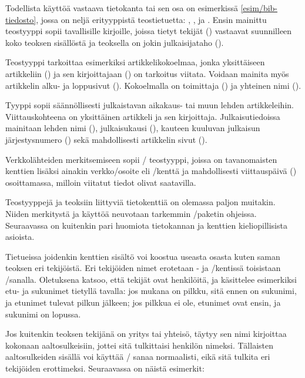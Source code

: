 Todellista käyttöä vastaava tietokanta tai sen osa on esimerkissä
\ref{esim/bib-tiedosto}, jossa on neljä erityyppistä teostietuetta:
, ,  ja .
Ensin mainittu teostyyppi  sopii tavallisille kirjoille,
joissa tietyt tekijät () vastaavat suunnilleen koko
teoksen sisällöstä ja teoksella on jokin julkaisijataho
().

Teostyyppi  tarkoittaa esimerkiksi
artikkelikokoelmaa, jonka yksittäiseen artikkeliin () ja
sen kirjoittajaan () on tarkoitus viitata. Voidaan mainita
myös artikkelin alku- ja loppusivut (). Kokoelmalla on
toimittaja () ja yhteinen nimi ().

Tyyppi  sopii säännöllisesti julkaistavan aikakaus- tai
muun lehden artikkeleihin. Viittauskohteena on yksittäinen artikkeli ja
sen kirjoittaja. Julkaisutiedoissa mainitaan lehden nimi
(), julkaisukausi (), kauteen
kuuluvan julkaisun järjestysnumero () sekä mahdollisesti
artikkelin sivut ().

Verkkolähteiden merkitsemiseen sopii \-/ teostyyppi,
joissa on tavanomaisten kenttien lisäksi ainakin verkko\-/osoite eli
\-/kenttä ja mahdollisesti viittauspäivä ()
osoittamassa, milloin viitatut tiedot olivat saatavilla.

Teostyyppejä ja teoksiin liittyviä tietokenttiä on olemassa paljon
muitakin. Niiden merkitystä ja käyttöä neuvotaan tarkemmin
\-/paketin ohjeissa. Seuraavassa on kuitenkin pari
huomiota tietokannan ja kenttien kieliopillisista asioista.

Tietueissa joidenkin kenttien sisältö voi koostua useasta osasta kuten
saman teoksen eri tekijöistä. Eri tekijöiden nimet erotetaan
- ja \-/kentissä toisistaan
\-/sanalla. Oletuksena  katsoo, että
tekijät ovat henkilöitä, ja käsittelee esimerkiksi etu- ja sukunimet
tietyllä tavalla: jos mukana on pilkku, sitä ennen on sukunimi, ja
etunimet tulevat pilkun jälkeen; jos pilkkua ei ole, etunimet ovat
ensin, ja sukunimi on lopussa.

Jos kuitenkin teoksen tekijänä on yritys tai yhteisö, täytyy sen nimi
kirjoittaa kokonaan aaltosulkeisiin, jottei sitä tulkittaisi henkilön
nimeksi. Tällaisten aaltosulkeiden sisällä voi käyttää \-/
sanaa normaalisti, eikä sitä tulkita eri tekijöiden erottimeksi.
Seuraavassa on näistä esimerkit:

